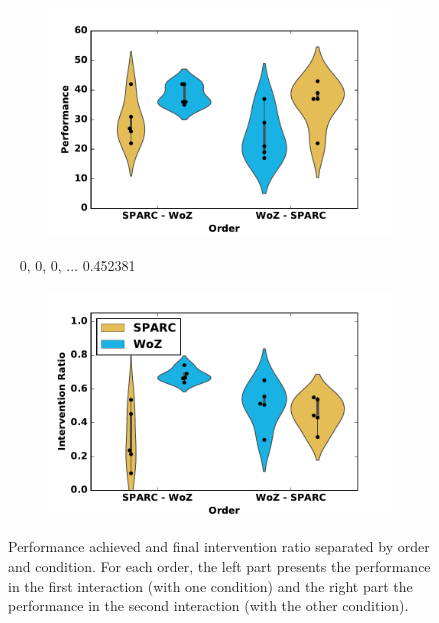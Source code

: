 \begin{figure}[ht]
	\centering
	\begin{subfigure}[t]{0.5\textwidth}
		\centering
		\includegraphics[width=1.\textwidth]{perf_divided.pdf}
	\end{subfigure}%
	~  0, 0, 0, ... 	0.452381
	\begin{subfigure}[t]{0.5\textwidth}
		\centering
		\includegraphics[width=1.\textwidth]{ratio_divided.pdf}
	\end{subfigure}
	\caption{Performance achieved and final intervention ratio separated by order and condition. For each order, the left part presents the performance in the first interaction (with one condition) and the right part the performance in the second interaction (with the other condition).}
	\label{fig:woz_separated}
\end{figure}


